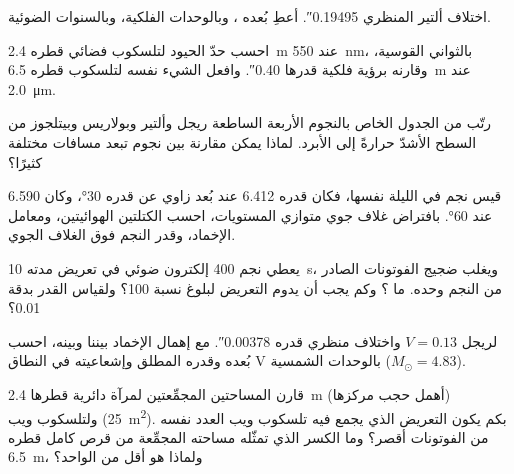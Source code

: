 \begin{exercise}[$\star$]\label{exo:b1:observing-the-sky:2}
اختلاف ألتير المنظري \ang{;;0.19495}. أعطِ بُعده ، وبالوحدات الفلكية، وبالسنوات الضوئية.
\end{exercise}

\begin{exercise}[$\star$]\label{exo:b1:observing-the-sky:3}
احسب حدّ الحيود لتلسكوب فضائي قطره \qty{2.4}{m} عند \qty{550}{nm}، بالثواني القوسية، وقارنه برؤية فلكية قدرها \ang{;;0.40}. وافعل الشيء نفسه لتلسكوب قطره \qty{6.5}{m} عند \qty{2.0}{\micro\metre}.
\end{exercise}

\begin{exercise}[$\star$]\label{exo:b1:observing-the-sky:4}
رتّب من الجدول الخاص بالنجوم الأربعة الساطعة ريجل وألتير وبولاريس وبيتلجوز من السطح الأشدّ حرارةً إلى الأبرد. لماذا يمكن مقارنة  بين نجوم تبعد مسافات مختلفة كثيرًا؟
\end{exercise}

\begin{exercise}[$\star\star$]\label{exo:b1:observing-the-sky:5}
قيس نجم في الليلة نفسها، فكان قدره 6.412 عند بُعد زاوي عن  قدره \ang{30}، وكان 6.590 عند \ang{60}. بافتراض غلاف جوي متوازي المستويات، احسب الكتلتين الهوائيتين، ومعامل الإخماد، وقدر النجم فوق الغلاف الجوي.
\end{exercise}

\begin{exercise}[$\star\star$]\label{exo:b1:observing-the-sky:6}
يعطي نجم 400 إلكترون ضوئي في تعريض مدته \qty{10}{s}، ويغلب ضجيج الفوتونات الصادر من النجم وحده. ما ؟ وكم يجب أن يدوم التعريض لبلوغ نسبة 100؟ ولقياس القدر بدقة \num{0.01}؟
\end{exercise}

\begin{exercise}[$\star\star$]\label{exo:b1:observing-the-sky:7}
لريجل $V = 0.13$ واختلاف منظري قدره \ang{;;0.00378}. مع إهمال الإخماد بيننا وبينه، احسب بُعده وقدره المطلق وإشعاعيته في النطاق V بالوحدات الشمسية ($M_\odot = 4.83$).
\end{exercise}

\begin{exercise}[$\star\star$]\label{exo:b1:observing-the-sky:8}
قارن المساحتين المجمِّعتين لمرآة دائرية قطرها \qty{2.4}{m} (أهمل حجب مركزها) ولتلسكوب ويب (\qty{25}{m^2}). بكم يكون التعريض الذي يجمع فيه تلسكوب ويب العدد نفسه من الفوتونات أقصر؟ وما الكسر الذي تمثّله مساحته المجمِّعة من قرص كامل قطره \qty{6.5}{m}، ولماذا هو أقل من الواحد؟
\end{exercise}


